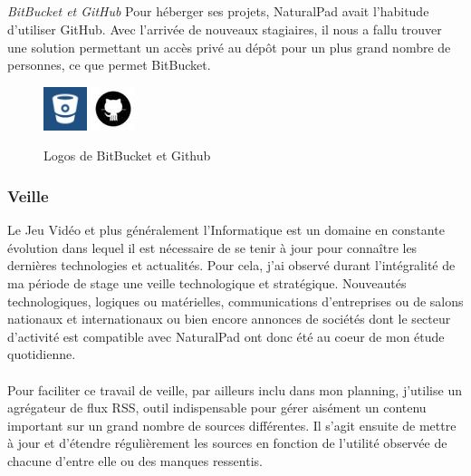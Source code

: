 		\subparagraph{}	\emph{BitBucket et GitHub}
Pour héberger ses projets, NaturalPad avait l'habitude d'utiliser GitHub. Avec l'arrivée de nouveaux stagiaires, il nous a fallu trouver une solution permettant un accès privé au dépôt pour un plus grand nombre de personnes, ce que permet BitBucket.
	\begin{figure}[!h]
		\centering
		\includegraphics[height=48px]{images/bitbucket.jpg}
		\includegraphics[height=48px]{images/github.jpg}
		\caption{Logos de BitBucket et Github}
		\label{logos_bitbucket_github}
	\end{figure}

	\subsubsection{Veille}
Le Jeu Vidéo et plus généralement l'Informatique est un domaine en constante évolution dans lequel il est nécessaire de se tenir à jour pour connaître les dernières technologies et actualités. Pour cela, j'ai observé durant l'intégralité de ma période de stage une veille technologique et stratégique. Nouveautés technologiques, logiques ou matérielles, communications d'entreprises ou de salons nationaux et internationaux ou bien encore annonces de sociétés dont le secteur d'activité est compatible avec NaturalPad ont donc été au coeur de mon étude quotidienne.
\paragraph{}Pour faciliter ce travail de veille, par ailleurs inclu dans mon planning, j'utilise un agrégateur de flux RSS, outil indispensable pour gérer aisément un contenu important sur un grand nombre de sources différentes. Il s'agit ensuite de mettre à jour et d'étendre régulièrement les sources en fonction de l'utilité observée de chacune d'entre elle ou des manques ressentis. 
